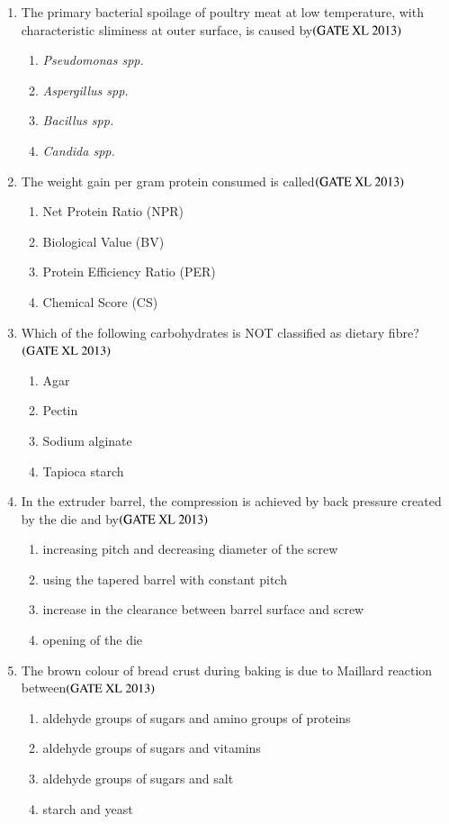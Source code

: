 \documentclass[journal]{IEEEtran}
\begin{document}
\begin{enumerate}
\item The primary bacterial spoilage of poultry meat at low temperature, with characteristic sliminess at outer surface, is caused by\hfill $\left(\text{GATE XL 2013}\right)$
\begin{enumerate}
    \item \textit{Pseudomonas spp.}
    \item \textit{Aspergillus spp.}
    \item \textit{Bacillus spp.}
    \item \textit{Candida spp.}
\end{enumerate}

\item The weight gain  per gram protein consumed is called\hfill $\left(\text{GATE XL 2013}\right)$
\begin{enumerate}
    \item Net Protein Ratio (NPR)
    \item Biological Value (BV)
    \item Protein Efficiency Ratio (PER)
    \item Chemical Score (CS)
\end{enumerate}

\item Which of the following carbohydrates is NOT classified as dietary fibre?\hfill $\left(\text{GATE XL 2013}\right)$
\begin{enumerate}
    \item Agar
    \item Pectin
    \item Sodium alginate
    \item Tapioca starch
\end{enumerate}

\item In the extruder barrel, the compression is achieved by back pressure created by the die and by\hfill $\left(\text{GATE XL 2013}\right)$
\begin{enumerate}
    \item increasing pitch and decreasing diameter of the screw
    \item using the tapered barrel with constant pitch
    \item increase in the clearance between barrel surface and screw
    \item opening of the die
\end{enumerate}

\item The brown colour of bread crust during baking is due to Maillard reaction between\hfill $\left(\text{GATE XL 2013}\right)$
\begin{enumerate}
    \item aldehyde groups of sugars and amino groups of proteins
    \item aldehyde groups of sugars and vitamins
    \item aldehyde groups of sugars and salt
    \item starch and yeast
\end{enumerate}


\end{enumerate}
\end{document}
